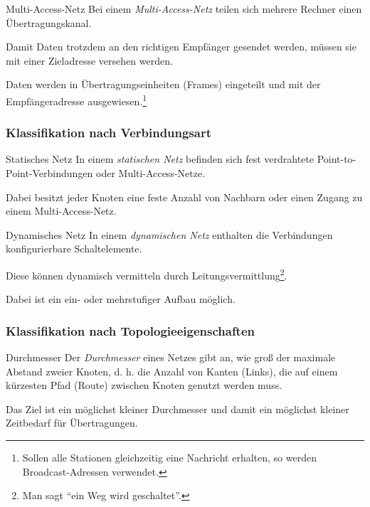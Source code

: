 \begin{defi}{Multi-Access-Netz}
    Bei einem \emph{Multi-Access-Netz} teilen sich mehrere Rechner einen Übertragungskanal.

    Damit Daten trotzdem an den richtigen Empfänger gesendet werden, müssen sie mit einer Zieladresse versehen werden.

    Daten werden in Übertragungseinheiten (Frames) eingeteilt und mit der Empfängeradresse ausgewiesen.\footnote{Sollen alle Stationen gleichzeitig eine Nachricht erhalten, so werden Broadcast-Adressen verwendet.}
\end{defi}

\subsubsection{Klassifikation nach Verbindungsart}

\begin{defi}{Statisches Netz}
    In einem \emph{statischen Netz} befinden sich fest verdrahtete Point-to-Point-Verbindungen oder Multi-Access-Netze.

    Dabei besitzt jeder Knoten eine feste Anzahl von Nachbarn oder einen Zugang zu einem Multi-Access-Netz.
\end{defi}

\begin{defi}{Dynamisches Netz}
    In einem \emph{dynamischen Netz} enthalten die Verbindungen konfigurierbare Schaltelemente.

    Diese können dynamisch vermitteln durch Leitungsvermittlung\footnote{Man sagt \enquote{ein Weg wird geschaltet}.}.

    Dabei ist ein ein- oder mehrstufiger Aufbau möglich.
\end{defi}

\subsubsection{Klassifikation nach Topologieeigenschaften}

\begin{defi}{Durchmesser}
    Der \emph{Durchmesser} eines Netzes gibt an, wie groß der maximale Abstand zweier Knoten, d. h. die Anzahl von Kanten (Links), die auf einem kürzesten Pfad (Route) zwischen Knoten genutzt werden muss.

    Das Ziel ist ein möglichst kleiner Durchmesser und damit ein möglichst kleiner Zeitbedarf für Übertragungen.
\end{defi}

